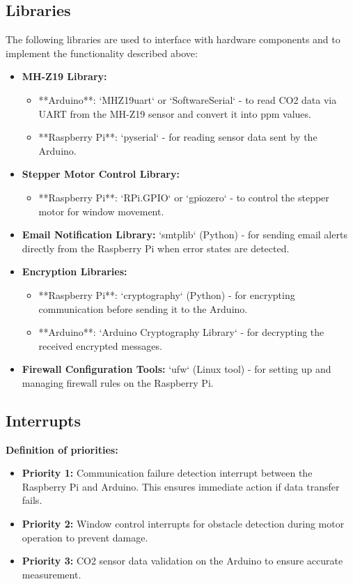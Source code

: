 \subsection{Libraries}
The following libraries are used to interface with hardware components and to implement the functionality described above:
\begin{itemize}
    \item \textbf{MH-Z19 Library:} 
        \begin{itemize}
            \item **Arduino**: `MHZ19uart` or `SoftwareSerial` - to read CO2 data via UART from the MH-Z19 sensor and convert it into ppm values.
            \item **Raspberry Pi**: `pyserial` - for reading sensor data sent by the Arduino.
        \end{itemize}
    \item \textbf{Stepper Motor Control Library:} 
        \begin{itemize}
            \item **Raspberry Pi**: `RPi.GPIO` or `gpiozero` - to control the stepper motor for window movement.
        \end{itemize}
    \item \textbf{Email Notification Library:} `smtplib` (Python) - for sending email alerts directly from the Raspberry Pi when error states are detected.
    \item \textbf{Encryption Libraries:}
        \begin{itemize}
            \item **Raspberry Pi**: `cryptography` (Python) - for encrypting communication before sending it to the Arduino.
            \item **Arduino**: `Arduino Cryptography Library` - for decrypting the received encrypted messages.
        \end{itemize}
    \item \textbf{Firewall Configuration Tools:} `ufw` (Linux tool) - for setting up and managing firewall rules on the Raspberry Pi.
\end{itemize}

\subsection{Interrupts}
\textbf{Definition of priorities:}
\begin{itemize}
    \item \textbf{Priority 1:} Communication failure detection interrupt between the Raspberry Pi and Arduino. This ensures immediate action if data transfer fails.
    \item \textbf{Priority 2:} Window control interrupts for obstacle detection during motor operation to prevent damage.
    \item \textbf{Priority 3:} CO2 sensor data validation on the Arduino to ensure accurate measurement.
\end{itemize}

